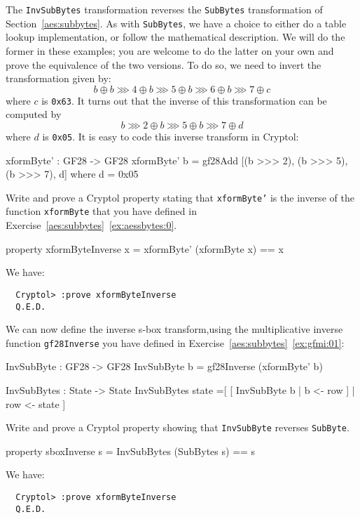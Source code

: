 The {\tt InvSubBytes} transformation reverses the {\tt SubBytes}
transformation of Section~\ref{aes:subbytes}. As with {\tt SubBytes},
we have a choice to either do a table lookup implementation, or follow
the mathematical description.  We will do the former in these examples;
you are welcome to do the latter on your own and prove the equivalence
of the two versions.  To do so, we need to invert the transformation
given by:
$$
 b \oplus b \ggg 4 \oplus b \ggg 5 \oplus b \ggg 6 \oplus b \ggg 7 \oplus c
$$
where $c$ is {\tt 0x63}. It turns out that the inverse of this
transformation can be computed by
$$
 b \ggg 2 \oplus b \ggg 5 \oplus b \ggg 7 \oplus d
$$
where $d$ is {\tt 0x05}.  It is easy to code this inverse transform in
Cryptol:

\begin{code}
  xformByte' : GF28 -> GF28
  xformByte' b = gf28Add [(b >>> 2), (b >>> 5), (b >>> 7), d]
    where d = 0x05
\end{code}

\begin{Exercise}\label{ex:invsb:1}
  Write and prove a Cryptol property stating that {\tt xformByte'} is
  the inverse of the function {\tt xformByte} that you have defined in
  Exercise~\ref{aes:subbytes}~\ref{ex:aessbytes:0}.
\end{Exercise}
\begin{Answer}
\begin{code}
  property xformByteInverse x = xformByte' (xformByte x) == x
\end{code}
We have:
\begin{Verbatim}
  Cryptol> :prove xformByteInverse
  Q.E.D.
\end{Verbatim}
\end{Answer}

\unparagraph We can now define the inverse s-box
transform,\indAESInvSbox using the multiplicative inverse function
{\tt gf28Inverse} you have defined in
Exercise~\ref{aes:subbytes}~\ref{ex:gfmi:01}:
\begin{code}
  InvSubByte : GF28 -> GF28
  InvSubByte b = gf28Inverse (xformByte' b)

  InvSubBytes : State -> State
  InvSubBytes state =[ [ InvSubByte b | b <- row ] 
                     | row <- state
                     ]
\end{code}

\begin{Exercise}\label{ex:invsb:2}
  Write and prove a Cryptol property showing that {\tt InvSubByte}
  reverses {\tt SubByte}.\indAESSbox
\end{Exercise}
\begin{Answer}
\begin{code}
  property sboxInverse s = InvSubBytes (SubBytes s) == s
\end{code}
We have:
\begin{Verbatim}
  Cryptol> :prove xformByteInverse
  Q.E.D.
\end{Verbatim}
\end{Answer}

